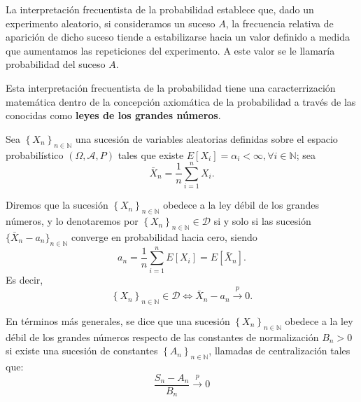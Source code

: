 
La interpretaci\'on frecuentista de la probabilidad establece que, dado un experimento aleatorio, si consideramos un suceso $A$, la frecuencia relativa de aparici\'on de dicho suceso tiende a estabilizarse hacia un valor definido a medida que aumentamos las repeticiones del experimento. A este valor se le llamar\'ia probabilidad del suceso $A$.

Esta interpretaci\'on frecuentista de la probabilidad tiene una caracterrizaci\'on matem\'atica dentro de la concepci\'on axiom\'atica de la probabilidad a trav\'es de las conocidas como \textbf{leyes de los grandes n\'umeros}.


\begin{definicion}
Sea $ \left\{X_n\right\}_{n\in\mathbb{N}}$ una sucesi\'on de variables aleatorias definidas sobre el espacio probabil\'istico $\left(\Omega,\mathcal{A}, P\right) $ tales que existe $E[X_i]=\alpha_i<\infty,\forall i \in\mathbb{N}$; sea
\begin{equation*}
\bar{X}_n=\dfrac{1}{n}\sum_{i=1}^{n}X_i.
\end{equation*}

Diremos que la sucesi\'on $ \left\{X_n\right\}_{n\in\mathbb{N}}$ obedece a la ley d\'ebil de los grandes n\'umeros, y lo denotaremos por $ \left\{X_n\right\}_{n\in\mathbb{N}}\in\mathscr{D}$ si y solo si las sucesi\'on $\{\bar{X}_n-a_n\}_{n\in\mathbb{N}}$ converge en probabilidad hacia cero, siendo 
\begin{equation*}
a_n=\dfrac{1}{n}\sum_{i=1}^{n}E[X_i]=E[\bar{X}_n].
\end{equation*}
Es decir,
\begin{equation*}
\left\{X_n\right\}_{n\in\mathbb{N}}\in\mathscr{D}\Leftrightarrow \bar{X}_n-a_n\overset{p}{\to} 0.
\end{equation*}
\end{definicion}

En t\'erminos m\'as generales, se dice que una sucesi\'on $ \left\{X_n\right\}_{n\in\mathbb{N}}$ obedece a la ley d\'ebil de los grandes n\'umeros respecto de las constantes de normalizaci\'on $B_n>0$ si existe una sucesi\'on de constantes $ \left\{A_n\right\}_{n\in\mathbb{N}}$, llamadas de centralizaci\'on tales que:
\begin{equation*}
\dfrac{S_n-A_n}{B_n}\overset{p}{\to}0
\end{equation*}

